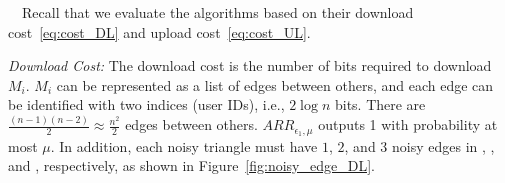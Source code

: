 \smallskip
{}~~Recall that we evaluate the algorithms based on their download cost~\eqref{eq:cost_DL} and upload cost~\eqref{eq:cost_UL}.

\textit{Download Cost:} The download cost is the number of bits required
to download $M_i$.
$M_i$ can be represented
as
a list of edges between others, and each edge
can be
identified with two indices (user IDs), i.e., $2 \log n$ bits.
There are $\frac{(n-1)(n-2)}{2} \approx \frac{n^2}{2}$ edges between others.
$ARR_{\epsilon_1,\mu}$ outputs 1 with probability at most $\mu$. 
In addition, each noisy triangle must have $1$, $2$, and $3$ noisy edges in \AlgOne{}, \AlgTwo{}, and \AlgThree{}, respectively, as shown in Figure~\ref{fig:noisy_edge_DL}.

